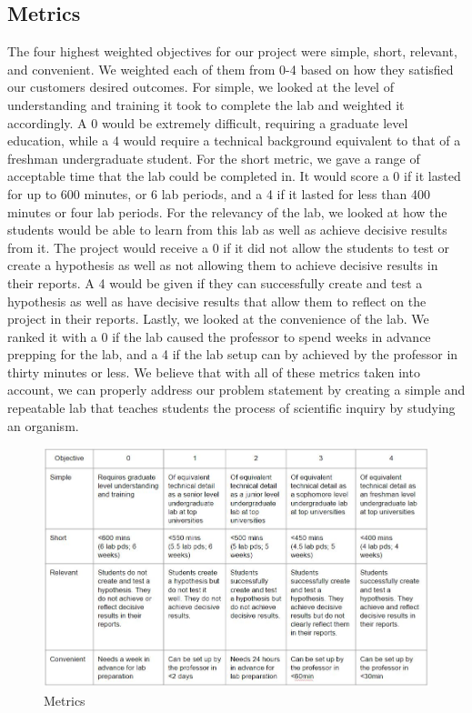 \documentclass{article}
\begin{document}
\subsection{Metrics}
\par The four highest weighted objectives for our project were simple, short, relevant, and convenient. We weighted each of them from 0-4 based on how they satisfied our customers desired outcomes. For simple, we looked at the level of understanding and training it took to complete the lab and weighted it accordingly. A 0 would be extremely difficult, requiring a graduate level education, while a 4 would require a technical background equivalent to that of a freshman undergraduate student. For the short metric, we gave a range of acceptable time that the lab could be completed in. It would score a 0 if it lasted for up to 600 minutes, or 6 lab periods, and a 4 if it lasted for less than 400 minutes or four lab periods. For the relevancy of the lab, we looked at how the students would be able to learn from this lab as well as achieve decisive results from it. The project would receive a 0 if it did not allow the students to test or create a hypothesis as well as not allowing them to achieve decisive results in their reports. A 4 would be given if they can successfully create and test a hypothesis as well as have decisive results that allow them to reflect on the project in their reports. Lastly, we looked at the convenience of the lab. We ranked it with a 0 if the lab caused the professor to spend weeks in advance prepping for the lab, and a 4 if the lab setup can by achieved by the professor in thirty minutes or less. We believe that with all of these metrics taken into account, we can properly address our problem statement by creating a simple and repeatable lab that teaches students the process of scientific inquiry by studying an organism.

\begin{figure}[ht!]
\centering
\includegraphics[scale=0.4]{metrics.JPG}
\caption{Metrics}
\label{fig:metrics}
\end{figure}
\end{document}
